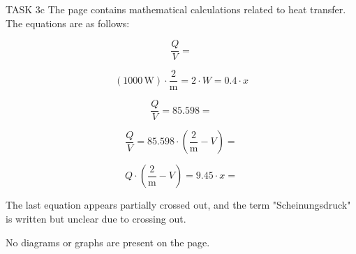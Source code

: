 TASK 3c  
The page contains mathematical calculations related to heat transfer. The equations are as follows:

\[
\frac{Q}{V} =
\]

\[
(1000 \, \text{W}) \cdot \frac{2}{\text{m}} = 2 \cdot W = 0.4 \cdot x
\]

\[
\frac{Q}{V} = 85.598 =
\]

\[
\frac{Q}{V} = 85.598 \cdot \left( \frac{2}{\text{m}} - V \right) =
\]

\[
Q \cdot \left( \frac{2}{\text{m}} - V \right) = 9.45 \cdot x = 
\]

The last equation appears partially crossed out, and the term "Scheinungsdruck" is written but unclear due to crossing out.

No diagrams or graphs are present on the page.